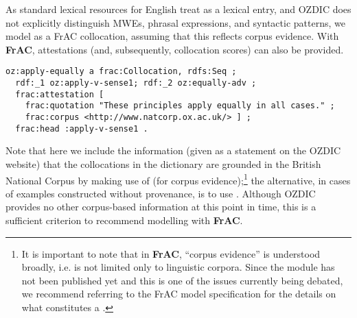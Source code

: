 \documentclass[output=paper,colorlinks,citecolor=brown]{langscibook}
\begin{document}
As standard lexical resources for English %
treat  as a lexical entry, and OZDIC does not explicitly distinguish MWEs, phrasal expressions, and syntactic patterns, we model  as a FrAC collocation, assuming that this reflects corpus evidence.
With \textbf{FrAC}, attestations (and, subsequently, collocation scores) can also be provided.


{\listingsize
\begin{verbatim}
oz:apply-equally a frac:Collocation, rdfs:Seq ;
  rdf:_1 oz:apply-v-sense1; rdf:_2 oz:equally-adv ;
  frac:attestation [
    frac:quotation "These principles apply equally in all cases." ;
    frac:corpus <http://www.natcorp.ox.ac.uk/> ] ;
  frac:head :apply-v-sense1 .
\end{verbatim}
}

\noindent
Note that here we include the information (given as a statement on the OZDIC website) that the collocations in the dictionary are grounded in the British National Corpus by making use of  (for corpus evidence);\footnote{It is important to note that in \textbf{FrAC}, ``corpus evidence'' is understood broadly, i.e. is not limited only to linguistic corpora. Since the module has not been published yet and this is one of the issues currently being debated, we recommend referring to the FrAC model specification for the details on what constitutes a .} the alternative, in cases of examples constructed without provenance, is to use .
Although OZDIC provides no other corpus-based information at this point in time, this is a sufficient criterion to recommend modelling with \textbf{FrAC}.
\end{document}
